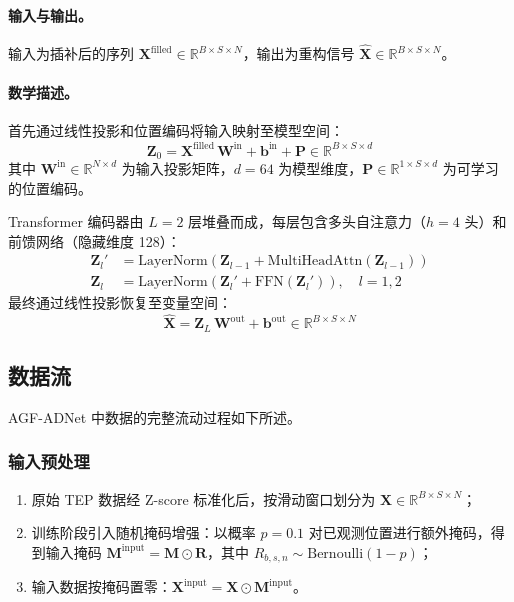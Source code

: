 \documentclass[UTF8]{ctexart}
\begin{document}
\paragraph{输入与输出。}
输入为插补后的序列 $\mathbf{X}^{\text{filled}} \in \mathbb{R}^{B \times S \times N}$，输出为重构信号 $\hat{\mathbf{X}} \in \mathbb{R}^{B \times S \times N}$。

\paragraph{数学描述。}
首先通过线性投影和位置编码将输入映射至模型空间：
\begin{equation}
    \mathbf{Z}_0 = \mathbf{X}^{\text{filled}} \, \mathbf{W}^{\text{in}} + \mathbf{b}^{\text{in}} + \mathbf{P} \in \mathbb{R}^{B \times S \times d}
\end{equation}
其中 $\mathbf{W}^{\text{in}} \in \mathbb{R}^{N \times d}$ 为输入投影矩阵，$d=64$ 为模型维度，$\mathbf{P} \in \mathbb{R}^{1 \times S \times d}$ 为可学习的位置编码。

Transformer 编码器由 $L=2$ 层堆叠而成，每层包含多头自注意力（$h=4$ 头）和前馈网络（隐藏维度 128）：
\begin{align}
    \mathbf{Z}_l' &= \mathrm{LayerNorm}\!\left(\mathbf{Z}_{l-1} + \mathrm{MultiHeadAttn}(\mathbf{Z}_{l-1})\right) \\
    \mathbf{Z}_l &= \mathrm{LayerNorm}\!\left(\mathbf{Z}_l' + \mathrm{FFN}(\mathbf{Z}_l')\right), \quad l = 1, 2
\end{align}
最终通过线性投影恢复至变量空间：
\begin{equation}
    \hat{\mathbf{X}} = \mathbf{Z}_L \, \mathbf{W}^{\text{out}} + \mathbf{b}^{\text{out}} \in \mathbb{R}^{B \times S \times N}
\end{equation}

\subsection{数据流}

AGF-ADNet 中数据的完整流动过程如下所述。

\subsubsection{输入预处理}

\begin{enumerate}
    \item 原始 TEP 数据经 Z-score 标准化后，按滑动窗口划分为 $\mathbf{X} \in \mathbb{R}^{B \times S \times N}$；
    \item 训练阶段引入随机掩码增强：以概率 $p=0.1$ 对已观测位置进行额外掩码，得到输入掩码 $\mathbf{M}^{\text{input}} = \mathbf{M} \odot \mathbf{R}$，其中 $R_{b,s,n} \sim \mathrm{Bernoulli}(1-p)$；
    \item 输入数据按掩码置零：$\mathbf{X}^{\text{input}} = \mathbf{X} \odot \mathbf{M}^{\text{input}}$。
\end{enumerate}
\end{document}
